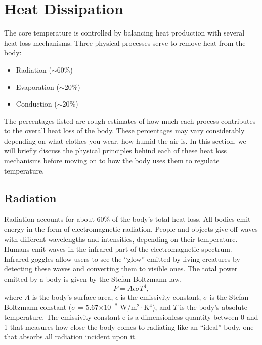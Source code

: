 \section{Heat Dissipation}

The core temperature is controlled by balancing heat production with several heat loss mechanisms.  Three physical processes serve to remove heat from the body:
\begin{itemize}
\item Radiation ($\sim$60\%)
\item Evaporation ($\sim$20\%)
\item Conduction ($\sim$20\%)
\end{itemize}
The percentages listed are rough estimates of how much each process contributes to the overall heat loss of the body. These percentages may vary considerably depending on what clothes you wear, how humid the air is. 
In this section, we will briefly discuss the physical principles behind each of these heat loss mechanisms before moving on to how the body uses them to regulate temperature.

\subsection{Radiation}

Radiation accounts for about 60\% of the body’s total heat loss.  All bodies emit energy in the form of electromagnetic radiation.  People and objects give off waves with different wavelengths and intensities, depending on their temperature.  Humans emit waves in the infrared part of the electromagnetic spectrum.  Infrared goggles allow users to see the ``glow'' emitted by living creatures by detecting these waves and converting them to visible ones.  
The total power emitted by a body is given by  the Stefan-Boltzmann law,
\begin{equation}\label{eqn4-1}
P = A\epsilon\sigma T^4,
\end{equation}
where $A$ is the body’s surface area, $\epsilon$ is the emissivity constant, $\sigma$ is the Stefan-Boltzmann constant ($\sigma$ = 5.67$\times 10^{-8}$ W/m$^2\cdot$K$^4$), and $T$ is the body’s absolute temperature.  The emissivity constant e is a dimensionless quantity between 0 and 1 that measures how close the body comes to radiating like an ``ideal'' body, one that absorbs all radiation incident upon it.

